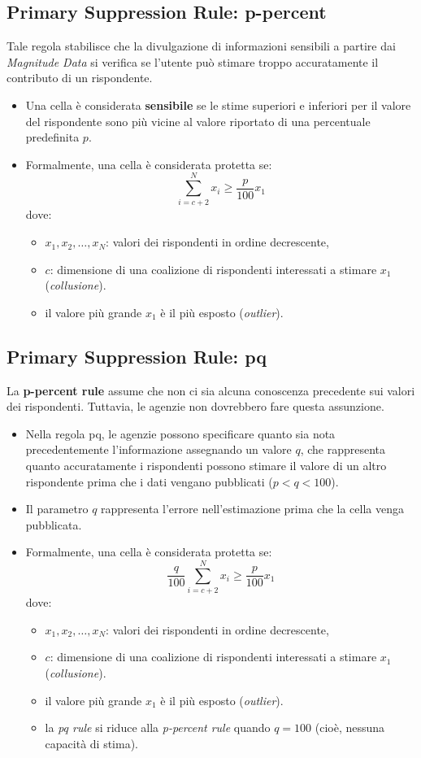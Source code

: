 \documentclass{report}
\begin{document}
\subsection{Primary Suppression Rule: p-percent}
Tale regola stabilisce che la divulgazione di informazioni sensibili a partire dai \textit{Magnitude Data} si verifica se l'utente può stimare troppo accuratamente il contributo di un rispondente. 
\begin{itemize}
    \item Una cella è considerata \textbf{sensibile} se le stime superiori e inferiori per il valore del rispondente sono più vicine al valore riportato di una percentuale predefinita \( p \).
    \item Formalmente, una cella è considerata protetta se:
    \[
    \sum_{i=c+2}^{N} x_i \geq \frac{p}{100} x_1
    \]
    dove:
    \begin{itemize}
        \item \( x_1, x_2, \ldots, x_N \): valori dei rispondenti in ordine decrescente,
        \item \( c \): dimensione di una coalizione di rispondenti interessati a stimare \( x_1 \) (\textit{collusione}).
        \item il valore più grande \( x_1 \) è il più esposto (\textit{outlier}).
    \end{itemize}
\end{itemize}

\subsection{Primary Suppression Rule: pq}
La \textbf{p-percent rule} assume che non ci sia alcuna conoscenza precedente sui valori dei rispondenti. Tuttavia, le agenzie non dovrebbero fare questa assunzione.
\begin{itemize}
    \item Nella regola pq, le agenzie possono specificare quanto sia nota precedentemente l'informazione assegnando un valore \( q \), che rappresenta quanto accuratamente i rispondenti possono stimare il valore di un altro rispondente prima che i dati vengano pubblicati (\( p < q < 100 \)).
    \item Il parametro \( q \) rappresenta l'errore nell'estimazione prima che la cella venga pubblicata.
    \item Formalmente, una cella è considerata protetta se:
    \[
    \frac{q}{100} \sum_{i=c+2}^{N} x_i \geq \frac{p}{100} x_1
    \]
    dove:
    \begin{itemize}
        \item \( x_1, x_2, \ldots, x_N \): valori dei rispondenti in ordine decrescente,
        \item \( c \): dimensione di una coalizione di rispondenti interessati a stimare \( x_1 \) (\textit{collusione}).
        \item il valore più grande \( x_1 \) è il più esposto (\textit{outlier}).
        \item la \textit{pq rule} si riduce alla \textit{p-percent rule} quando \( q = 100 \) (cioè, nessuna capacità di stima).
    \end{itemize}
\end{itemize}
\end{document}
